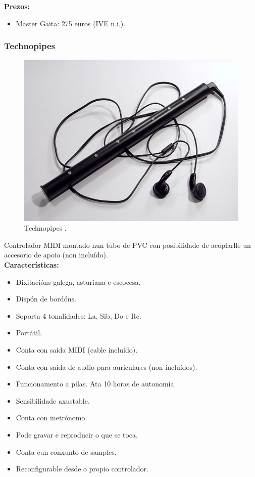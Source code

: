   \textbf{Prezos:}

  \begin{itemize}
   \item Master Gaita: 275 euros (IVE n.i.).
  \end{itemize}

 \subsubsection{Technopipes}

  \begin{figure}[htbp]
   \centering
   \includegraphics[scale=0.3,keepaspectratio=true]{./imagenes/technopipes.jpg}
   \caption[Technopipes]{Technopipes \cite{Technopipes}.}
   \label{figura:Technopipes}
  \end{figure}

  Controlador MIDI montado nun tubo de PVC con posibilidade de acoplarlle un
  accesorio de apoio (non incluído). \\

  \textbf{Características:}

  \begin{itemize}
   \item Dixitacións galega, asturiana e escocesa.
   \item Dispón de bordóns.
   \item Soporta 4 tonalidades: La, Sib, Do e Re.
   \item Portátil.
   \item Conta con saída MIDI (cable incluído).
   \item Conta con saída de audio para auriculares (non incluídos).
   \item Funcionamento a pilas. Ata 10 horas de autonomía.
   \item Sensibilidade axustable.
   \item Conta con metrónomo.
   \item Pode gravar e reproducir o que se toca.
   \item Conta cun conxunto de samples.
   \item Reconfigurable desde o propio controlador.
  \end{itemize}

